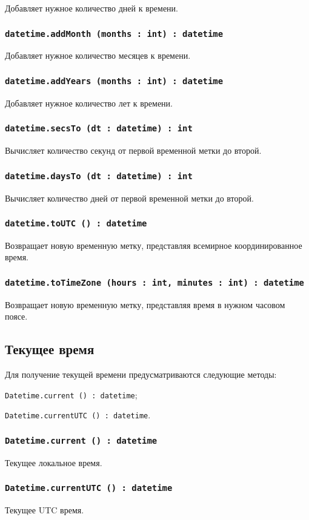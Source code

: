 Добавляет нужное количество дней к времени.

\subsubsection{\texttt{datetime.addMonth (months : int) : datetime}}

Добавляет нужное количество месяцев к времени.

\subsubsection{\texttt{datetime.addYears (months : int) : datetime}}

Добавляет нужное количество лет к времени.

\subsubsection{\texttt{datetime.secsTo (dt : datetime) : int}}

Вычисляет количество секунд от первой временной метки до второй.

\subsubsection{\texttt{datetime.daysTo (dt : datetime) : int}}

Вычисляет количество дней от первой временной метки до второй.

\subsubsection{\texttt{datetime.toUTC () : datetime}}

Возвращает новую временную метку, представляя всемирное координированное время.

\subsubsection{\texttt{datetime.toTimeZone (hours : int, minutes : int) : datetime}}

Возвращает новую временную метку, представляя время в нужном часовом поясе.

\subsection{Текущее время}

Для получение текущей времени предусматриваются следующие методы:
\begin{icItems}
	\item \texttt{Datetime.current () : datetime};
	\item \texttt{Datetime.currentUTC () : datetime}.
\end{icItems}

\subsubsection{\texttt{Datetime.current () : datetime}}

Текущее локальное время.

\subsubsection{\texttt{Datetime.currentUTC () : datetime}}

Текущее UTC время.
